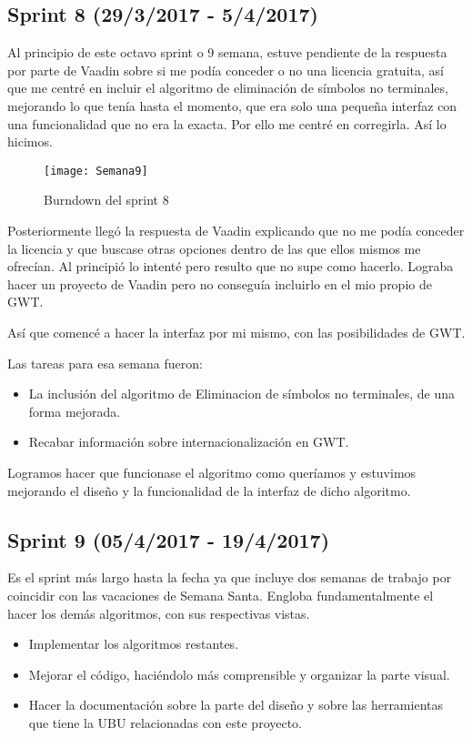 \subsection{Sprint 8 (29/3/2017 - 5/4/2017)}

Al principio de este octavo sprint o 9 semana, estuve pendiente de la respuesta por parte de Vaadin sobre si me podía conceder o no una licencia gratuita, así que me centré en incluir el algoritmo de eliminación de símbolos no terminales, mejorando lo que tenía hasta el momento, que era solo una pequeña interfaz con una funcionalidad que no era la exacta. Por ello me centré en corregirla. Así lo hicimos.

\begin{figure}[h]
\centering
\texttt{[image: Semana9]}
\caption{Burndown del sprint 8}
\label{fig:A.7}
\end{figure}

Posteriormente llegó la respuesta de Vaadin explicando que no me podía conceder la licencia y que buscase otras opciones dentro de las que ellos mismos me ofrecían. Al principió lo intenté pero resulto que no supe como hacerlo. Lograba hacer un proyecto de Vaadin pero no conseguía incluirlo en el mio propio de GWT.

Así que comencé a hacer la interfaz por mi mismo, con las posibilidades de GWT.

Las tareas para esa semana fueron: 

\begin{itemize}
\item La inclusión del algoritmo de Eliminacion de símbolos no terminales, de una forma mejorada.
\item Recabar información sobre internacionalización en GWT.
\end{itemize}

Logramos hacer que funcionase el algoritmo como queríamos y estuvimos mejorando el diseño y la funcionalidad de la interfaz de dicho algoritmo.

\subsection{Sprint 9 (05/4/2017 - 19/4/2017)}

Es el sprint más largo hasta la fecha ya que incluye dos semanas de trabajo por coincidir con las vacaciones de Semana Santa. Engloba fundamentalmente el hacer los demás algoritmos, con sus respectivas vistas.

\begin{itemize}
\item Implementar los algoritmos restantes.
\item Mejorar el código, haciéndolo más comprensible y organizar la parte visual.
\item Hacer la documentación sobre la parte del diseño y sobre las herramientas que tiene la UBU relacionadas con este proyecto.
\end{itemize}

